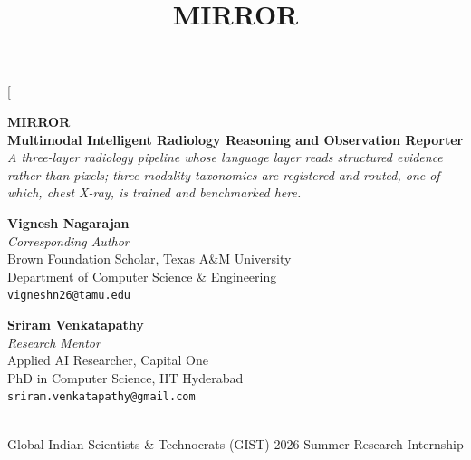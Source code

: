 \documentclass[10pt,twocolumn]{article}
\title{MIRROR}   %
\begin{document}
\twocolumn[{%
\centering
\vspace{6pt}
{\Huge\bfseries MIRROR}\\[6pt]
{\large\bfseries Multimodal Intelligent Radiology Reasoning and Observation Reporter}\\[10pt]
{\itshape\normalsize A three-layer radiology pipeline whose language layer reads
structured evidence rather than pixels; three modality taxonomies are registered
and routed, one of which, chest X-ray, is trained and benchmarked here.}\\[18pt]

\normalsize
\begin{minipage}[t]{0.45\textwidth}
\centering
{\large\textbf{Vignesh Nagarajan}}\\[3pt]
{\small\itshape Corresponding Author}\\[4pt]
{\small Brown Foundation Scholar, Texas A\&M University}\\[2pt]
{\small Department of Computer Science \& Engineering}\\[2pt]
{\small\texttt{vigneshn26@tamu.edu}}
\end{minipage}%
\hspace{0.06\textwidth}%
\begin{minipage}[t]{0.45\textwidth}
\centering
{\large\textbf{Sriram Venkatapathy}}\\[3pt]
{\small\itshape Research Mentor}\\[4pt]
{\small Applied AI Researcher, Capital One}\\[2pt]
{\small PhD in Computer Science, IIT Hyderabad}\\[2pt]
{\small\texttt{sriram.venkatapathy@gmail.com}}
\end{minipage}\\[14pt]
{\small Global Indian Scientists \& Technocrats (GIST) 2026 Summer Research Internship}\\[20pt]

}
\end{document}

